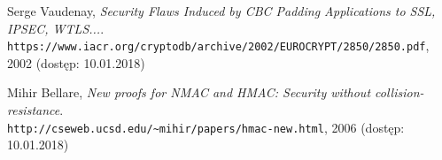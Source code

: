 \begin{thebibliography}{9}
Serge Vaudenay,
\textit{Security Flaws Induced by CBC Padding Applications to SSL, IPSEC, WTLS...}. \\
\texttt{https://www.iacr.org/cryptodb/archive/2002/EUROCRYPT/2850/2850.pdf}, 2002 (dostęp: 10.01.2018)

Mihir Bellare,
\textit{New proofs for NMAC and HMAC: Security without collision-resistance}. \\
\texttt{http://cseweb.ucsd.edu/\textasciitilde mihir/papers/hmac-new.html}, 2006 (dostęp: 10.01.2018)

\end{thebibliography}